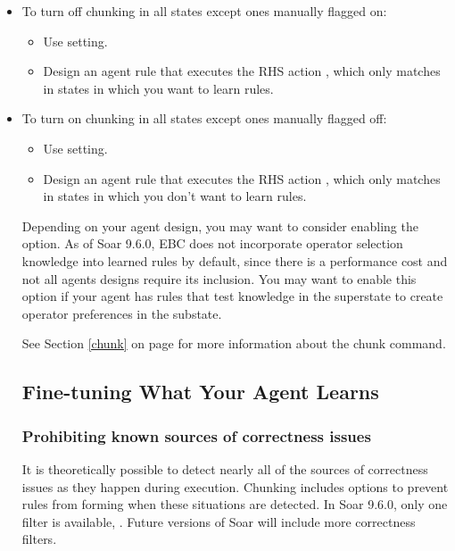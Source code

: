 \begin{itemize}
	\item To turn off chunking in all states except ones manually flagged on: 
	\begin{itemize}
		\item Use  setting.
		\item Design an agent rule that executes the RHS action , which only matches in states in which you want to learn rules.
	\end{itemize}
	\item To turn on chunking in all states except ones manually flagged off: 
	\begin{itemize}
		\item Use  setting.
		\item Design an agent rule that executes the RHS action , which only matches in states in which you don't want to learn rules.
\end{itemize}

Depending on your agent design, you may want to consider enabling the  option.  As of Soar 9.6.0, EBC does not incorporate operator selection knowledge into learned rules by default, since there is a performance cost and not all agents designs require its inclusion.  You may want to enable this option if your agent has rules that test knowledge in the superstate to create operator preferences in the substate.

See Section \ref{chunk} on page \pageref{chunk} for more information about the chunk command.


\subsection{Fine-tuning What Your Agent Learns}
\label{CHUNKING-usage-tuning}

\subsubsection{Prohibiting known sources of correctness issues}
\label{CHUNKING-usage-tuning-correctness}

It is theoretically possible to detect nearly all of the sources of correctness issues as they happen during execution.  Chunking includes options to prevent rules from forming when these situations are detected.  In Soar 9.6.0, only one filter is available, .  Future versions of Soar will include more correctness filters.


\end{itemize}

